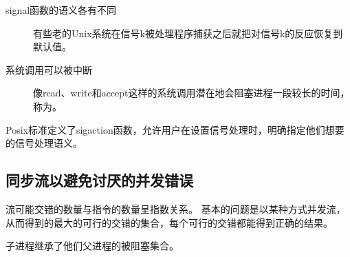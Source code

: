 {{{            \begin{description}
                \item[signal函数的语义各有不同]
                {
                    有些老的Unix系统在信号k被处理程序捕获之后就把对信号k的反应恢复到默认值。
                }
                \item[系统调用可以被中断]
                {
                    像read、write和accept这样的系统调用潜在地会阻塞进程一段较长的时间，称为。
                }
            \end{description}

            Posix标准定义了sigaction函数，允许用户在设置信号处理时，明确指定他们想要的信号处理语义。
        }
    }

    \subsection{同步流以避免讨厌的并发错误}
    {
        流可能交错的数量与指令的数量呈指数关系。
        基本的问题是以某种方式并发流，从而得到的最大的可行的交错的集合，每个可行的交错都能得到正确的结果。

        子进程继承了他们父进程的被阻塞集合。
    }
}
